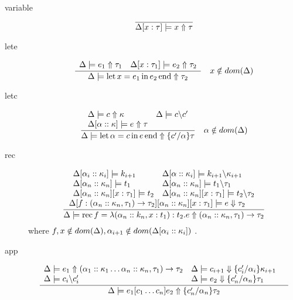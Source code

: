 \documentclass[12pt,twoside,fleqn]{amsart}
\theoremstyle{plain}
\theoremstyle{plain}
\theoremstyle{definition}
\begin{document}
\begin{description}
\item [variable]
\[
\overline{\Delta  [x  :\tau   ] \models x \Uparrow \tau  }\]

\item [lete]
\[
\frac{\begin{array}{ll}
\Delta  \models e_{1}  \Uparrow \tau _{1}  & \Delta  [x  :\tau _{1}  ] \models e_{2} \Uparrow \tau _{2}
\end{array}}{\Delta  \models \mathrm{let}\, x =e_{1} \, \mathrm{in}\, e_{2} \, \mathrm{end}  \Uparrow \tau _{2} }\quad x\notin dom(\Delta )\]

\item [letc]
\[
\frac{\begin{array}{ll}
\Delta  \models c \Uparrow \kappa  & \Delta  \models c \backslash c'\\
\Delta  [\alpha   ::\kappa   ] \models e \Uparrow \tau  & 
\end{array}}{\Delta  \models \mathrm{let}\, \alpha  =c \, \mathrm{in}\, e \, \mathrm{end}  \Uparrow \{c' /\alpha  \}\tau  }\quad \alpha \notin dom(\Delta )\]

\item [rec]
\[
\frac{\begin{array}{l}
\begin{array}{ll}
\Delta  [\alpha _{i}  ::\kappa _{i}  ] \models k_{i+1} & \Delta  [\alpha   ::\kappa _{i}  ] \models k_{i+1} \backslash \kappa _{i+1}\\
\Delta  [\alpha _{n}  ::\kappa _{n}  ] \models t_{1} & \Delta  [\alpha _{n}  ::\kappa _{n}  ] \models t_{1} \backslash \tau _{1}\\
\Delta  [\alpha _{n}  ::\kappa _{n}  ][x :\tau _{1} ] \models t_{2} & \Delta  [\alpha _{n}  ::\kappa _{n}  ][x :\tau _{1} ] \models t_{2} \backslash \tau _{2}
\end{array}\\
\Delta [f :(\alpha _{n}::\kappa _{n},\tau _{1})\rightarrow \tau _{2} ][\alpha _{n} ::\kappa _{n} ][x :\tau _{1} ] \models e \Downarrow \tau _{2}
\end{array} }{\Delta  \models \mathrm{rec}\, f =\lambda (\alpha _{n} ::k_{n} ,x :t_{1} ):t_{2} .e  \Uparrow (\alpha _{n}::\kappa _{n},\tau _{1})\rightarrow \tau _{2}  }\]
  where \( f,x\notin dom(\Delta ),\alpha _{i+1}\notin dom(\Delta  [\alpha _{i}  ::\kappa _{i}  ]) \)
.
\item [app]
\[
\frac{\begin{array}{lll}
\Delta  \models e_{1}  \Uparrow (\alpha _{1}::\kappa _{1}\ldots \alpha _{n}::\kappa _{n},\tau _{1})\rightarrow \tau _{2}  & \Delta  \models c_{i+1} \Downarrow \{c_{i}' /\alpha _{i} \}\kappa _{i+1} & \\
\Delta  \models c_{i} \backslash c_{i}' & \Delta  \models e_{2} \Downarrow \{c_{n}' /\alpha _{n} \}\tau _{1} & 
\end{array} }{\Delta  \models e_{1}[c_{1}\ldots c_{n}]e_{2}  \Uparrow \{c_{n}' /\alpha _{n} \}\tau _{2}  }\]


\end{description}
\end{document}
